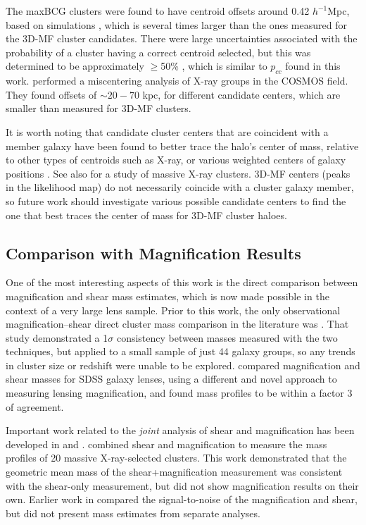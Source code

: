 The maxBCG clusters were found to have centroid offsets around 0.42 $h^{-1}$Mpc, based on simulations \citep{Johnston07}, which is several times larger than the ones measured for the \ac{3D-MF} cluster candidates. There were large uncertainties associated with the probability of a cluster having a correct centroid selected, but this was determined to be approximately $\ge$50\% \citep[see Figure 5 in][]{Johnston07}, which is similar to $p_{cc}$ found in this work. \citet{George12} performed a miscentering analysis of X-ray groups in the \ac{COSMOS} field. They found offsets of $\sim 20-70$ kpc, for different candidate centers, which are smaller than measured for \ac{3D-MF} clusters. 

It is worth noting that candidate cluster centers that are coincident with a member galaxy have been found to better trace the halo's center of mass, relative to other types of centroids such as X-ray, or various weighted centers of galaxy positions \citep{George12}. See also \citet{Bildfell08} for a study of massive X-ray clusters. \ac{3D-MF} centers (peaks in the likelihood map) do not necessarily coincide with a cluster galaxy member, so future work should investigate various possible candidate centers to find the one that best traces the center of mass for \ac{3D-MF} cluster haloes.


\subsection{Comparison with Magnification Results}
\label{sec:magn}

One of the most interesting aspects of this work is the direct comparison between magnification and shear mass estimates, which is now made possible in the context of a very large lens sample. Prior to this work, the only observational magnification--shear direct cluster mass comparison in the literature was \citet{Ford12}. That study demonstrated a 1$\sigma$ consistency between masses measured with the two techniques, but applied to a small sample of just 44 galaxy groups, so any trends in cluster size or redshift were unable to be explored. \citet{Huff14} compared magnification and shear masses for SDSS galaxy lenses, using a different and novel approach to measuring lensing magnification, and found mass profiles to be within a factor 3 of agreement.

Important work related to the {\it joint} analysis of shear and magnification has been developed in \citet{Umetsu11} and \citet{Umetsu13}. \citet{Umetsu14} combined shear and magnification to measure the mass profiles of 20 massive X-ray-selected clusters. This work demonstrated that the geometric mean mass of the shear+magnification measurement was consistent with the shear-only measurement, but did not show magnification results on their own. Earlier work in \citet{Umetsu11} compared the signal-to-noise of the magnification and shear, but did not present mass estimates from separate analyses. 

